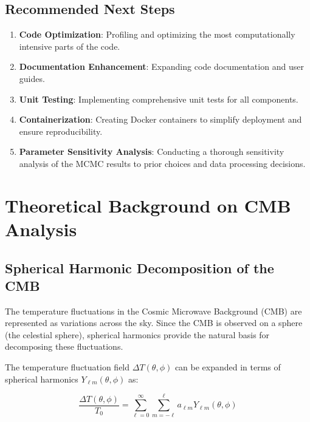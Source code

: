 \documentclass[11pt]{article}
\begin{document}
\subsection{Recommended Next Steps}

\begin{enumerate}
    \item \textbf{Code Optimization}: Profiling and optimizing the most computationally intensive parts of the code.
    
    \item \textbf{Documentation Enhancement}: Expanding code documentation and user guides.
    
    \item \textbf{Unit Testing}: Implementing comprehensive unit tests for all components.
    
    \item \textbf{Containerization}: Creating Docker containers to simplify deployment and ensure reproducibility.
    
    \item \textbf{Parameter Sensitivity Analysis}: Conducting a thorough sensitivity analysis of the MCMC results to prior choices and data processing decisions.
\end{enumerate}

\section{Theoretical Background on CMB Analysis}

\subsection{Spherical Harmonic Decomposition of the CMB}

The temperature fluctuations in the Cosmic Microwave Background (CMB) are represented as variations across the sky. Since the CMB is observed on a sphere (the celestial sphere), spherical harmonics provide the natural basis for decomposing these fluctuations.

The temperature fluctuation field $\Delta T(\theta, \phi)$ can be expanded in terms of spherical harmonics $Y_{\ell m}(\theta, \phi)$ as:

\begin{equation}
\frac{\Delta T(\theta, \phi)}{T_0} = \sum_{\ell=0}^{\infty} \sum_{m=-\ell}^{\ell} a_{\ell m} Y_{\ell m}(\theta, \phi)
\end{equation}
\end{document}
